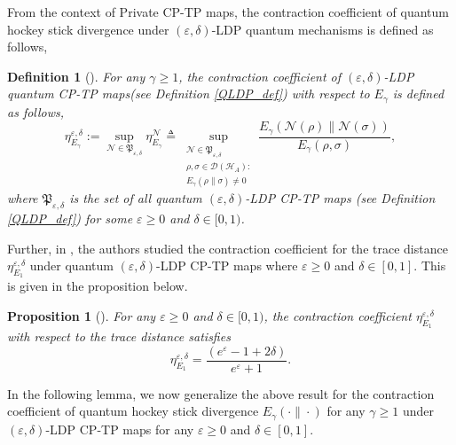 \documentclass[onecolumn,ldraftcls, 11pt]{IEEEtran}
\newcommand{\eps}{\varepsilon}
\newcommand*{\cH}{\mathcal{H}}
\newcommand*{\cD}{\mathcal{D}}
\newcommand*{\cN}{\mathcal{N}}
\newtheorem{definition}{Definition}
\newtheorem{proposition}{Proposition}
\begin{document}
From the context of Private CP-TP maps, the contraction coefficient of quantum hockey stick divergence under $(\eps,\delta)$-LDP quantum mechanisms is defined as follows,

\begin{definition}[\cite{Nuradha25}]\label{def_contr_coeff_F}
    For any $\gamma \geq 1$, the contraction coefficient of  $(\eps,\delta)$-LDP quantum CP-TP maps(see Definition \ref{QLDP_def}) with respect to $E_{\gamma}$ is defined as follows,
    \begin{equation}
        \eta^{\eps,\delta}_{E_{\gamma}} := \sup_{\cN \in \mathfrak{P}_{\eps,\delta}} \eta^{\cN}_{E_{\gamma}} \triangleq  \sup_{\substack{\cN \in \mathfrak{P}_{\eps,\delta}\\ \rho,\sigma \in \cD(\cH_A):\\ E_{\gamma}(\rho\|\sigma) \neq 0}}\frac{E_{\gamma}(\cN(\rho)\|\cN(\sigma))}{E_{\gamma}(\rho,\sigma)},\label{contrac_F_def_eq}
    \end{equation}
    where $\mathfrak{P}_{\eps,\delta}$ is the set of all quantum $(\eps,\delta)$-LDP CP-TP maps (see Definition \ref{QLDP_def}) for some $\eps\geq 0$ and $ \delta \in [0,1)$.
\end{definition}




Further, in \cite{Nuradha25}, the authors studied the contraction coefficient for the trace distance $\eta^{\eps,\delta}_{E_1}$ under quantum $(\eps,\delta)$-LDP CP-TP maps where $\eps \geq 0$ and $\delta \in [0,1]$. 
This is given in the proposition below.

\begin{proposition}[{\cite[Theorem 5]{Nuradha25}}]\label{prop_contrac_trac_dis}
For any $\eps \geq 0$ and $\delta \in [0,1)$, the contraction coefficient $\eta^{\eps,\delta}_{E_1}$ with respect to the trace distance satisfies
\begin{equation}
    \eta^{\eps,\delta}_{E_1} = \frac{(e^\eps - 1 + 2\delta)}{e^\eps + 1}.\label{prop_contrac_trac_dis_eq}
\end{equation}
\end{proposition}

In the following lemma, we now generalize the above result for the contraction coefficient of quantum hockey stick divergence $E_{\gamma}(\cdot\|\cdot)$ for any $\gamma \geq 1$ under $(\eps,\delta)$-LDP CP-TP maps for any $\eps \geq 0$ and $\delta \in [0,1]$.
\end{document}

